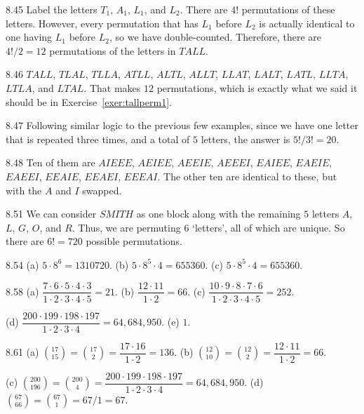 \begin{Answer}{8.45}
Label the letters $T_1$, $A_1$, $L_1$, and $L_2$.  There are $4!$ permutations of these letters.
However, every permutation that has $L_1$ before $L_2$ is actually identical to one having
$L_1$ before $L_2$, so we have double-counted.  Therefore, there are $4!/2=12$ permutations
of the letters in $TALL$.
\end{Answer}
\begin{Answer}{8.46}
$TALL$, $TLAL$, $TLLA$, $ATLL$, $ALTL$, $ALLT$, $LLAT$, $LALT$, $LATL$, $LLTA$, $LTLA$, and $LTAL$.
That makes $12$ permutations, which is exactly what we said it should be in Exercise~\ref{exer:tallperm1}.
\end{Answer}
\begin{Answer}{8.47}
Following similar logic to the previous few examples, since we have one letter that is repeated
three times, and a total of $5$ letters, the answer is $5!/3!=20$.
\end{Answer}
\begin{Answer}{8.48}
Ten of them are
$AIEEE$, $AEIEE$, $AEEIE$, $AEEEI$, $EAIEE$, $EAEIE$, $EAEEI$, $EEAIE$, $EEAEI$, $EEEAI$.
The other ten are identical to these, but with the $A$ and $I$ swapped.
\end{Answer}
\begin{Answer}{8.51}
We can consider $SMITH$ as one block along with the remaining
$5$ letters $A$, $L$, $G$, $O$, and $R$. Thus, we are
permuting $6$ `letters', all of which are unique.  So there are
$6!=720$ possible permutations.
\end{Answer}
\begin{Answer}{8.54}
(a) $5\cdot 8^6 =1310720$.
(b) $5\cdot 8^5 \cdot 4 = 655360 $.
(c) $5\cdot 8^5 \cdot 4 = 655360 $.
\end{Answer}
\begin{Answer}{8.58}
(a) $\dfrac{7\cdot 6\cdot 5 \cdot 4\cdot 3}{1\cdot 2\cdot 3\cdot 4 \cdot 5} = 21$.
(b) $\dfrac{12\cdot 11}{1\cdot 2} = 66$.
(c) $\dfrac{10\cdot 9\cdot 8\cdot 7\cdot 6}{1\cdot 2\cdot 3\cdot 4 \cdot 5} = 252$.

\noindent
(d) $\dfrac{200\cdot 199\cdot 198\cdot 197}{1\cdot 2\cdot 3\cdot 4} =64,684,950$.
(e) $1$.
\end{Answer}
\begin{Answer}{8.61}
(a) $\displaystyle\binom{17}{15} = \displaystyle\binom{17}{2}=\dfrac{17\cdot 16}{1\cdot 2} = 136$.
(b) $\displaystyle\binom{12}{10} = \displaystyle\binom{12}{2}=\dfrac{12\cdot 11}{1\cdot 2} = 66$.

\noindent
(c) $\displaystyle\binom{200}{196}=\displaystyle\binom{200}{4}=\dfrac{200\cdot 199\cdot 198\cdot 197}{1\cdot 2\cdot 3\cdot 4} =64,684,950$.
(d) $\displaystyle\binom{67}{66}=\displaystyle\binom{67}{1}=67/1=67$.
\end{Answer}
